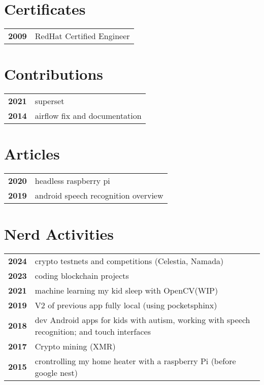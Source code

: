 \documentclass[bluebeige]{hipstercv}
\begin{document}
\begin{paracol}{2}
\begin{minipage}[t]{0.16\textwidth}
 \hspace{1em}
\end{minipage}

\vspace{3em}

\begin{minipage}[t]{0.3\textwidth}
\section*{Certificates}
\begin{tabular}{>{\footnotesize\bfseries}r >{\footnotesize}p{}}
    2009 & RedHat Certified Engineer
\end{tabular}

\section*{Contributions}
\begin{tabular}{>{\footnotesize\bfseries}r >{\footnotesize}p{}}
	2021 & superset\\
	2014 & airflow fix and documentation
\end{tabular}

\section*{Articles}
\begin{tabular}{>{\footnotesize\bfseries}r >{\footnotesize}p{}}
	2020 & headless raspberry pi\\
	2019 & android speech recognition overview
\end{tabular}

\end{minipage}\hfill
\begin{minipage}[t]{0.3\textwidth}
\section*{Nerd Activities}
\begin{tabular}{>{\footnotesize\bfseries}r >{\footnotesize}p{}}
	2024 & crypto testnets and competitions (Celestia, Namada)\\
	2023 & coding blockchain projects\\
	2021 & machine learning my kid sleep with OpenCV(WIP)\\
	2019 & V2 of previous app fully local (using pocketsphinx)\\
    2018 & dev Android apps for kids with autism, working with speech recognition; and touch interfaces\\
	2017 & Crypto mining (XMR)\\
	2015 & crontrolling my home heater with a raspberry Pi (before google nest)
\end{tabular}


\end{minipage}
\end{paracol}
\end{document}
